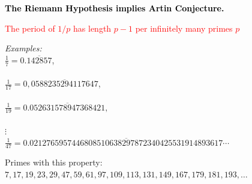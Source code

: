 \documentclass[landscape,display]{powersem} %
\newcommand{\heading}[1]{%
 \begin{center}
  \large\bf
  \shadowbox{{\textcolor{conceptcolor}{#1}}}%
 \end{center}
 \vspace{1ex minus 1ex}}
\begin{document}
\begin{slide}
 \heading{Hooley's Contribution}


\textcolor{black}{\textbf{The Riemann Hypothesis implies Artin Conjecture.}} \pause

\textcolor{red}{ The period of $1/p$ has length $p-1$ per infinitely many primes  $p$}\pause

\begin{minipage}{8cm}
\textit{Examples:} \\
$\frac17=0.\overline{142857}$,\\
\\
$\frac1{17}=0,\overline{0588235294117647}$,\\
\\
$\frac1{19}=0.\overline{052631578947368421},$\\
\\
$\vdots $\\
$\frac1{47}=$\scriptsize{$0.\overline{0212765957446808510638297872340425531914893617} \cdots$}\end{minipage}\medskip\pause

\begin{scriptsize}
Primes with this property: $7, 17, 19, 23, 29, 47, 59, 61, 97, 109, 113, 131, 149, 167, 179, 181, 193,\ldots$
\end{scriptsize}
\end{slide}
\end{document}
